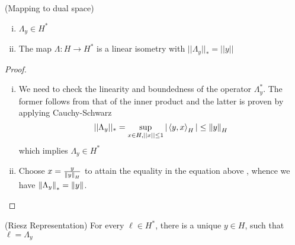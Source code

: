 \documentclass{article}
\begin{document}
\begin{lemma}
    (Mapping to dual space)
    \begin{enumerate}[i)]
        \item  \(\Lambda_y \in H^*\)
        \item The map  \(\Lambda: H \to H^*\) is a linear isometry with  \(||\Lambda_y||_{*}=||y||\)
    \end{enumerate}
\end{lemma}  

\begin{proof}
    \begin{enumerate}[i)]
        \item We need to check the linearity and boundedness of the operator  \(\Lambda_y^*\). The former follows from that of the inner product and the latter is proven by applying Cauchy-Schwarz  
        \begin{equation*}
            ||\Lambda_y||_* = \sup_{x\in H, ||x|| \leq 1} |\left<{y},{x}\right>_H| \leq \left\|{y}\right\|_H
        \end{equation*}  
        which implies  \(\Lambda_y \in H^*\)
        
        \item Choose  \(x = \frac{y}{\left\|{y}\right\|_H}\) to attain the equality in the equation above , whence we have  \(\left\|{\Lambda_y}\right\|_*=\left\|{y}\right\|\).
    \end{enumerate}
\end{proof}

\begin{theorem}
    (Riesz Representation)  
    For every  \(\ell \in H^*\), there is a unique  \(y \in H\), such that  \(\ell=\Lambda_y\)
\end{theorem}  
\end{document}
